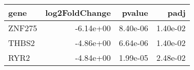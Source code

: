 \begin{tabular}{lrrr}
\toprule
  gene &  log2FoldChange &   pvalue &     padj \\
\midrule
ZNF275 &       -6.14e+00 & 8.40e-06 & 1.40e-02 \\
 THBS2 &       -4.86e+00 & 6.64e-06 & 1.40e-02 \\
  RYR2 &       -4.84e+00 & 1.99e-05 & 2.48e-02 \\
\bottomrule
\end{tabular}

